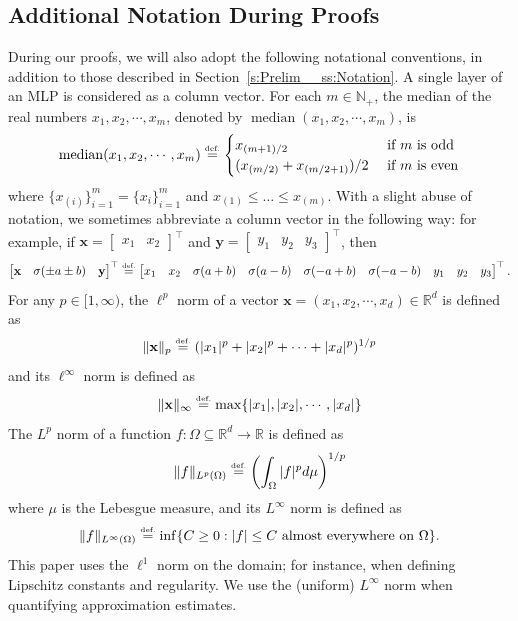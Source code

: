 \documentclass{article}
\numberwithin{equation}{section}
\theoremstyle{definition}
\newcommand{\eqdef}{\ensuremath{\stackrel{\mbox{\upshape\tiny def.}}{=}}}
\begin{document}
\subsection{Additional Notation During Proofs}
\label{s:Proofs__ss:FurtherNotation}
During our proofs, we will also adopt the following notational conventions, in addition to those described in Section~\ref{s:Prelim__ss:Notation}.
A single layer of an MLP is considered as a column vector. 
For each $m\in \mathbb{N}_+$, the median of the real numbers $x_1,x_2,\cdots,x_m$, denoted by $\operatorname{median}(x_1,x_2,\cdots,x_m)$, is
\begin{equation}
\label{eq:Median_Function}
    \operatorname{median}(x_1,x_2,\cdots,x_m) 
\eqdef 
    \begin{cases}
        x_{(m+1)/2} & \mbox{ if } m \mbox{ is odd} \\
        (x_{(m/2)}+x_{(m/2+1)})/2 & \mbox{ if } m \mbox{ is even} \\
    \end{cases}
\end{equation}
where $\{x_{(i)}\}_{i=1}^m=\{x_i\}_{i=1}^m$ and $x_{(1)}\le \dots \le x_{(m)}$.
With a slight abuse of notation, we sometimes abbreviate a column vector in the following way: for example, if $\mathbf{x} = \begin{bmatrix} x_1 & x_2 \end{bmatrix}^{\top}$ and $\mathbf{y} = \begin{bmatrix} y_1 & y_2 & y_3 \end{bmatrix}^{\top}$, then 
$$\begin{bmatrix} 
    \mathbf{x} & \sigma(\pm a \pm b) & \mathbf{y} 
\end{bmatrix}^{\top}
\eqdef
\begin{bmatrix} 
    x_1 & x_2 
    & \sigma(a+b) & \sigma(a-b) & \sigma(-a+b) & \sigma(-a-b)
    & y_1 & y_2 & y_3
\end{bmatrix}^{\top}
.
$$
For any $p\in[1,\infty)$, the $\ell^p$ norm of a vector $\mathbf{x}=(x_1,x_2,\cdots,x_d)\in\mathbb{R}^d$ is defined as 
$$\| \mathbf{x} \|_p \eqdef (|x_1|^p + |x_2|^p + \cdots + |x_d|^p)^{1/p}$$
and its $\ell^{\infty}$ norm is defined as 
$$\| \mathbf{x} \|_{\infty} \eqdef \max\{|x_1|,|x_2|,\cdots,|x_d|\}$$
The $L^p$ norm of a function $f:\Omega\subseteq\mathbb{R}^d \rightarrow \mathbb{R}$ is defined as 
$$\| f \|_{L^p(\Omega)} \eqdef 
\left( \int_{\Omega} |f|^p d\mu \right) ^ {1/p}$$
where $\mu$ is the Lebesgue measure, and its $L^{\infty}$ norm is defined as 
$$\| f \|_{L^{\infty}(\Omega)} \eqdef 
\inf\{ C\ge 0: |f| \le C \text{ almost everywhere on } \Omega \}.$$
This paper uses the $\ell^{1}$ norm on the domain; for instance, when defining Lipschitz constants and regularity. We use the (uniform) $L^{\infty}$ norm when quantifying approximation estimates.
\end{document}
